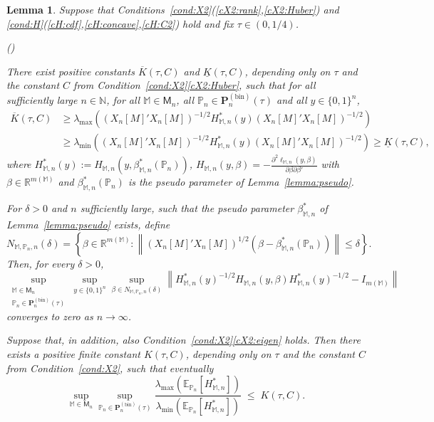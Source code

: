 \documentclass[preprint]{imsart}
\newcommand{\R}{{\mathbb R}}
\newcommand{\E}{{\mathbb E}}
\renewcommand{\P}{{\mathbb P}}
\newcommand{\N}{{\mathbb N}}
\newcommand{\M}{\mathbb M}
\newcommand{\lmax}{\lambda_{\max}}
\newcommand{\lmin}{\lambda_{\min}}
\newtheorem{lemma}[theorem]{Lemma}
\numberwithin{equation}{section}
\newcounter{rcnt}[section]
\renewcommand{\thercnt}{(\roman{rcnt})}
\begin{document}
\begin{lemma}\label{lemma:Hcontinuity}
Suppose that Conditions~\ref{cond:X2}(\ref{cX2:rank},\ref{cX2:Huber}) and \ref{cond:H}(\ref{cH:cdf},\ref{cH:concave},\ref{cH:C2}) hold and fix $\tau\in(0,1/4)$. 
\begin{list}{\thercnt}{
        \setlength\itemindent{0pt}
        \setlength\leftmargin{0pt}
        \setlength\partopsep{0pt} %
}
	\renewcommand{\theenumi}{(\roman{enumi})}
	\renewcommand{\labelenumi}{{\theenumi}} 
\item \label{l:Hcont:A}
There exist positive constants $\overline{K}(\tau, C)$ and $\underline{K}(\tau, C)$, depending only on $\tau$ and the constant $C$ from Condition~\ref{cond:X2}\eqref{cX2:Huber}, such that for all sufficiently large $n\in\N$, for all $\M\in\mathsf{M}_n$, all $\P_n\in\mathbf{P}_n^{(\mathrm{bin})}(\tau)$ and all $y\in\{0,1\}^n$, 
\begin{align*}
\overline{K}(\tau, C) &\ge
\lmax\left((X_n[M]'X_n[M])^{-1/2}H_{\M,n}^*(y)(X_n[M]'X_n[M])^{-1/2}\right)\\
&\ge\lmin\left((X_n[M]'X_n[M])^{-1/2}H_{\M,n}^*(y)(X_n[M]'X_n[M])^{-1/2}\right) \ge \underline{K}(\tau, C),
\end{align*}
where $H_{\M,n}^*(y) := H_{\M,n}(y,\beta_{\M,n}^*(\P_n))$, $H_{\M,n}(y,\beta) = -\frac{\partial^2 \ell_{\M,n}(y,\beta)}{\partial\beta\partial\beta'}$ with $\beta\in\R^{m(\M)}$ and $\beta_{\M,n}^*(\P_n)$ is the pseudo parameter of Lemma~\ref{lemma:pseudo}.


\item \label{l:Hcont:B}
For $\delta>0$ and $n$ sufficiently large, such that the pseudo parameter $\beta_{\M,n}^*$ of Lemma~\ref{lemma:pseudo} exists, define 
$$
N_{\M,\P_n,n}(\delta) = \left\{ \beta\in\R^{m(\M)} : \left\| (X_n[M]'X_n[M])^{1/2}(\beta - \beta_{\M,n}^*(\P_n)) \right\| \le \delta\right\}.
$$
Then, for every $\delta>0$,
$$
\sup_{\substack{\M\in\mathsf{M}_n\\\P_n\in\mathbf{P}_n^{(\mathrm{bin})}(\tau)}}
\sup_{y\in\{0,1\}^n}\sup_{\beta\in N_{\M,\P_n,n}(\delta)} \left\| H_{\M,n}^*(y)^{-1/2}H_{\M,n}(y,\beta)H_{\M,n}^*(y)^{-1/2} - I_{m(\M)} \right\|
$$
converges to zero as $n\to\infty$.


\item \label{l:Hcont:C}
Suppose that, in addition, also Condition~\ref{cond:X2}\eqref{cX2:eigen} holds. Then there exists a positive finite constant $K(\tau, C)$, depending only on $\tau$ and the constant $C$ from Condition~\ref{cond:X2}, such that eventually
$$
\sup_{\M\in\mathsf{M}_n}\sup_{\P_n\in\mathbf{P}_n^{\mathrm{(bin)}}(\tau)}\frac{\lmax(\E_{\P_n}[H_{\M,n}^*])}{\lmin(\E_{\P_n}[H_{\M,n}^*])} \;\le\; K(\tau, C).
$$

\end{list}


\end{lemma}
\end{document}

